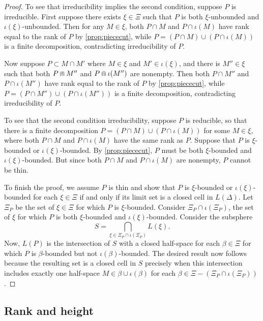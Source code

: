 \documentclass[11pt]{amsart}
\numberwithin{table}{section}
\numberwithin{figure}{section}
\theoremstyle{remark}
\begin{document}
\begin{proof}
  To see that irreducibility implies the second condition, suppose $P$
  is irreducible. First suppose there exists $\xi \in \Xi$ such that
  $P$ is both $\xi$-unbounded and $\iota(\xi)$-unbounded. Then for any
  $M\in \xi$, both $P \cap M$ and $P\cap \iota(M)$ have rank equal to
  the rank of $P$ by \cref{prop:piececut}, while
  $P = (P\cap M) \cup (P\cap \iota(M))$ is a finite decomposition,
  contradicting irreducibility of $P$.
  
  Now suppose $P\subset M\cap M'$ where $M\in \xi$ and
  $M'\in \iota(\xi)$, and there is $M''\in\xi$ such that both
  $P\doublecap M''$ and $P\doublecap \iota(M'')$ are nonempty. Then
  both $P \cap M''$ and $P\cap \iota(M'')$ have rank equal to the rank
  of $P$ by \cref{prop:piececut}, while
  $P = (P\cap M'') \cup (P\cap \iota(M''))$ is a finite decomposition,
  contradicting irreducibility of $P$.
  
  To see that the second condition irreducibility, suppose $P$ is
  reducible, so that there is a finite decomposition
  $P = (P\cap M) \cup (P\cap \iota(M))$ for some $M\in \xi$, where
  both $P\cap M$ and $P\cap \iota(M)$ have the same rank as
  $P$. Suppose that $P$ is $\xi$-bounded or
  $\iota(\xi)$-bounded. By \cref{prop:piececut}, $P$ must be both
  $\xi$-bounded and $\iota(\xi)$-bounded. But since both
  $P\cap M$ and $P\cap \iota(M)$ are nonempty, $P$ cannot be thin.

  To finish the proof, we assume $P$ is thin and show that $P$ is
  $\xi$-bounded or $\iota(\xi)$-bounded for each $\xi\in \Xi$ if and
  only if its limit set is a closed cell in $L(\Delta)$.  Let $\Xi_P$
  be the set of $\xi\in \Xi$ for which $P$ is $\xi$-bounded. Consider
  $\Xi_P \cap \iota(\Xi_P)$, the set of $\xi$ for which $P$ is both
  $\xi$-bounded and $\iota(\xi)$-bounded. Consider the subsphere
  \[
    S = \bigcap_{\xi \in \Xi_P\cap \iota(\Xi_P)} L(\xi).
  \]
  Now, $L(P)$ is the intersection of $S$ with a closed half-space for
  each $\beta \in \Xi$ for which $P$ is $\beta$-bounded but not
  $\iota(\beta)$-bounded. The desired result now follows because the
  resulting set is a closed cell in $S$ precisely when this
  intersection includes exactly one half-space
  $M\in \beta\cup \iota(\beta)$ for each
  $\beta \in \Xi - (\Xi_P \cap \iota(\Xi_P))$.
\end{proof}

\subsection{Rank and height}
\end{document}
